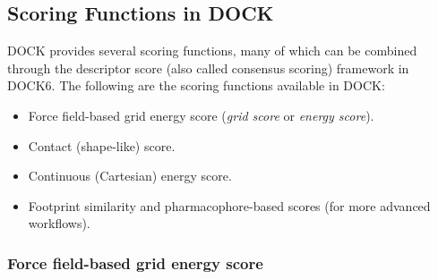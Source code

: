 \documentclass[12pt, a4paper]{article}
\begin{document}
\subsection{Scoring Functions in DOCK}

DOCK provides several scoring functions, many of which can be combined through the descriptor score (also called consensus scoring) framework in DOCK6\cite{CH7_Allen2015}. 
The following are the scoring functions available in DOCK:
\begin{itemize}
  \item Force field-based grid energy score (\textit{grid score} or \textit{energy score}).
  \item Contact (shape-like) score.
  \item Continuous (Cartesian) energy score.
  \item Footprint similarity and pharmacophore-based scores (for more advanced workflows).
\end{itemize}

\subsubsection{Force field-based grid energy score}
\end{document}
